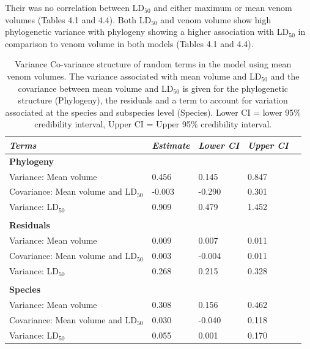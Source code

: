 Their was no correlation between LD$_{50}$ and either maximum or mean venom volumes (Tables 4.1 and 4.4). Both LD$_{50}$  and venom volume show high phylogenetic variance with phylogeny showing a higher association with LD$_{50}$ in comparison to venom volume in both models (Tables 4.1 and 4.4). 

\clearpage

\begin{table}[H]
  \centering
    \caption[ ]{Variance Co-variance structure of random terms in the model using mean venom volumes. The variance associated with mean volume and LD$_{50}$ and the covariance between mean volume and LD$_{50}$ is given for the phylogenetic structure (Phylogeny), the residuals and a term to account for variation associated at the species and subspecies level (Species). Lower CI = lower 95\% credibility interval, Upper CI = Upper 95\% credibility interval.}
\begin{tabular}{*5l}    \toprule
\emph{Terms} & \emph{Estimate} & \emph{Lower CI} & \emph{Upper CI}\\\midrule
\textbf{Phylogeny} &   &   &  \\ 
Variance: Mean volume & 0.456 & 0.145 & 0.847 \\
Covariance: Mean volume and LD$_{50}$ &-0.003  &-0.290  & 0.301 \\
Variance: LD$_{50}$ & 0.909 & 0.479 & 1.452 \\

 &   &   &  \\

\textbf{Residuals} &   &   &  \\ 
Variance: Mean volume & 0.009 & 0.007 & 0.011 \\
Covariance: Mean volume and LD$_{50}$ & 0.003  &  -0.004  & 0.011 \\
Variance: LD$_{50}$ & 0.268 & 0.215 & 0.328 \\

 &   &   &  \\ 

\textbf{Species} &   &   &  \\ 
Variance: Mean volume & 0.308 & 0.156 & 0.462 \\
Covariance: Mean volume and LD$_{50}$ & 0.030  &  -0.040  & 0.118 \\
Variance: LD$_{50}$ & 0.055 & 0.001 & 0.170 \\\bottomrule
 \hline
\end{tabular}
  \label{tbl:Table 4.1.}
\end{table}




